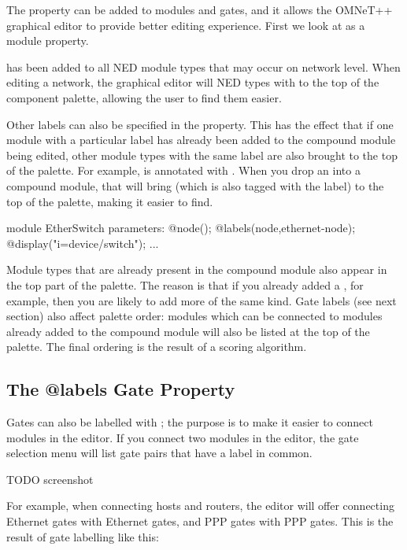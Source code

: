 The  property can be added to modules and gates, and it
allows the OMNeT++ graphical editor to provide better editing experience.
First we look at  as a module property.

 has been added to all NED module types that may occur on
network level. When editing a network, the graphical editor will NED types
with  to the top of the component palette, allowing the
user to find them easier.

Other labels can also be specified in the  property. This
has the effect that if one module with a particular label has already been
added to the compound module being edited, other module types with the same
label are also brought to the top of the palette. For example,
 is annotated with .
When you drop an  into a compound module, that will
bring  (which is also tagged with the
 label) to the top of the palette, making it easier to
find.

\begin{ned}
module EtherSwitch
{
    parameters:
        @node();
        @labels(node,ethernet-node);
        @display("i=device/switch");
    ...
}
\end{ned}

Module types that are already present in the compound module also appear in
the top part of the palette. The reason is that if you already added a
, for example, then you are likely to add more of the
same kind. Gate labels (see next section) also affect palette order: modules
which can be connected to modules already added to the compound module
will also be listed at the top of the palette. The final ordering is the
result of a scoring algorithm.


\subsection{The @labels Gate Property}

Gates can also be labelled with ; the purpose is to make it easier
to connect modules in the editor. If you connect two modules in the editor,
the gate selection menu will list gate pairs that have a label in common.

 TODO
screenshot


For example, when connecting hosts and routers, the editor will offer connecting
Ethernet gates with Ethernet gates, and PPP gates with PPP gates. This is the
result of gate labelling like this:


